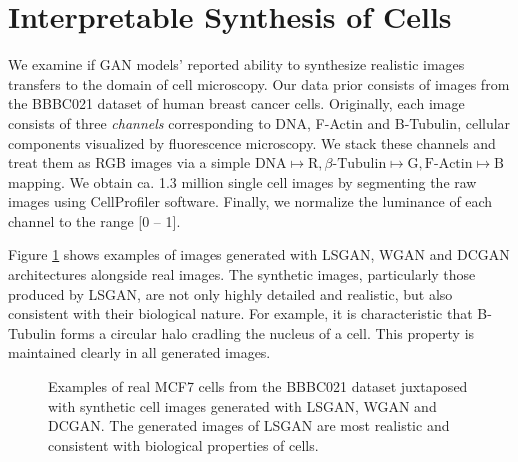 \documentclass{article}
\begin{document}
\section{Interpretable Synthesis of Cells}\label{synthesis}

We examine if GAN models' reported ability to synthesize realistic images
transfers to the domain of cell microscopy. Our data prior consists of images
from the BBBC021 dataset of human breast cancer cells. Originally, each image
consists of three \emph{channels} corresponding to DNA, F-Actin and B-Tubulin,
cellular components visualized by fluorescence microscopy. We stack these
channels and treat them as RGB images via a simple $\text{DNA} \mapsto \text{R},
\text{$\beta$-Tubulin} \mapsto \text{G}, \text{F-Actin} \mapsto \text{B}$
mapping. We obtain ca. 1.3 million single cell images by segmenting the raw
images using CellProfiler software. Finally, we normalize the luminance of each
channel to the range [0 -- 1].

Figure \ref{fig:generated} shows examples of images generated with LSGAN, WGAN
and DCGAN architectures alongside real images. The synthetic images,
particularly those produced by LSGAN, are not only highly detailed and
realistic, but also consistent with their biological nature. For example, it is
characteristic that B-Tubulin forms a circular halo cradling the nucleus of a
cell. This property is maintained clearly in all generated images.

\begin{figure}
  \centering
  \caption{Examples of real MCF7 cells from the BBBC021 dataset juxtaposed with synthetic cell images generated with LSGAN, WGAN and DCGAN. The generated images of LSGAN are most realistic and consistent with biological properties of cells.}
  \label{fig:generated}
\end{figure}
\end{document}
